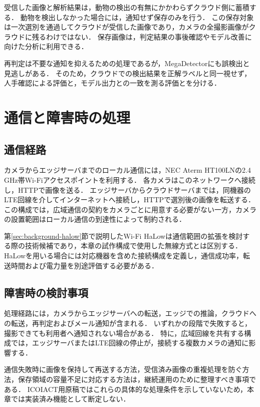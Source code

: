 受信した画像と解析結果は，動物の検出の有無にかかわらずクラウド側に蓄積する．
動物を検出しなかった場合には，通知せず保存のみを行う．
この保存対象は一次選別を通過してクラウドが受信した画像であり，カメラの全撮影画像がクラウドに残るわけではない．
保存画像は，判定結果の事後確認やモデル改善に向けた分析に利用できる．

再判定は不要な通知を抑えるための処理であるが，MegaDetectorにも誤検出と見逃しがある\cite{Fennell2022}．
そのため，クラウドでの検出結果を正解ラベルと同一視せず，人手確認による評価と，モデル出力との一致を測る評価とを分ける．

\section{通信と障害時の処理}
\subsection{通信経路}
カメラからエッジサーバまでのローカル通信には，NEC Aterm HT100LNの2.4\,GHz帯Wi-Fiアクセスポイントを利用する．
各カメラはこのネットワークへ接続し，HTTPで画像を送る．
エッジサーバからクラウドサーバまでは，同機器のLTE回線を介してインターネットへ接続し，HTTPで選別後の画像を転送する．
この構成では，広域通信の契約をカメラごとに用意する必要がない一方，カメラの設置範囲はローカル通信の到達性によって制約される．

第\ref{sec:background-halow}節で説明したWi-Fi HaLowは通信範囲の拡張を検討する際の技術候補であり，本章の試作構成で使用した無線方式とは区別する．
HaLowを用いる場合には対応機器を含めた接続構成を定義し，通信成功率，転送時間および電力量を別途評価する必要がある．

\subsection{障害時の検討事項}
処理経路には，カメラからエッジサーバへの転送，エッジでの推論，クラウドへの転送，再判定およびメール通知が含まれる．
いずれかの段階で失敗すると，撮影できても利用者へ通知されない場合がある．
特に，広域回線を共有する構成では，エッジサーバまたはLTE回線の停止が，接続する複数カメラの通知に影響する．

通信失敗時に画像を保持して再送する方法，受信済み画像の重複処理を防ぐ方法，保存領域の容量不足に対応する方法は，継続運用のために整理すべき事項である．
ICOIACT用原稿ではこれらの具体的な処理条件を示していないため，本章では実装済み機能として断定しない．
